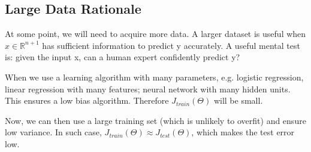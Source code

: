 \subsection{Large Data Rationale}
    At some point, we will need to acquire more data. A larger dataset is useful when $x\in\mathbb{R}^{n+1}$ has sufficient information to predict y accurately. 
    A useful mental test is: given the input x, can a human expert confidently predict y?

    When we use a learning algorithm with many parameters, e.g. logistic regression, linear regression with many features; neural network with many hidden units. This ensures a low bias algorithm. Therefore $J_{train} (\Theta)$ will be small. 
    \par Now, we can then use a large training set (which is unlikely to overfit) and ensure low variance. In such case, $J_{train} (\Theta) \approx J_{test}(\Theta)$, which makes the test error low. 

